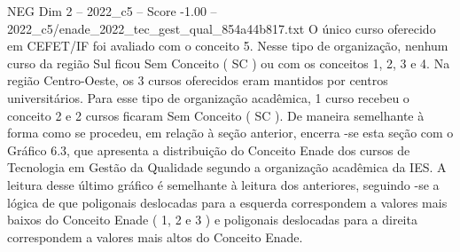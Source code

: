 \begin{textsample}{NEG Dim 2 – 2022\_c5 – Score -1.00 – 2022\_c5/enade\_2022\_tec\_gest\_qual\_854a44b817.txt}
O único curso oferecido em CEFET/IF foi avaliado com o conceito 5.
Nesse tipo de organização, nenhum curso da região Sul ficou Sem Conceito ( SC ) ou com os conceitos 1, 2, 3 e 4.
Na região Centro-Oeste, os 3 cursos oferecidos eram mantidos por centros universitários.
Para esse tipo de organização acadêmica, 1 curso recebeu o conceito 2 e 2 cursos ficaram Sem Conceito ( SC ).
De maneira semelhante à forma como se procedeu, em relação à seção anterior, encerra -se esta seção com o Gráfico 6.3, que apresenta a distribuição do Conceito Enade dos cursos de Tecnologia em Gestão da Qualidade segundo a organização acadêmica da IES.
A leitura desse último gráfico é semelhante à leitura dos anteriores, seguindo -se a lógica de que poligonais deslocadas para a esquerda correspondem a valores mais baixos do Conceito Enade ( 1, 2 e 3 ) e poligonais deslocadas para a direita correspondem a valores mais altos do Conceito Enade.

\end{textsample}
